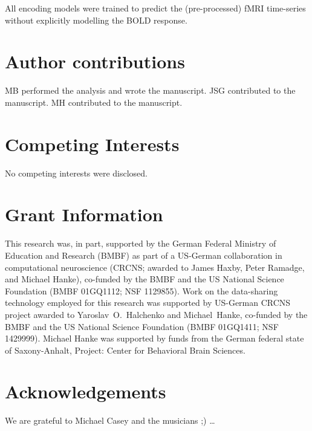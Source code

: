 All encoding models were trained to predict the (pre-processed) f{MRI}
time-series without explicitly modelling the BOLD response.


\section*{Author contributions}

MB performed the analysis and wrote the manuscript.
JSG contributed to the manuscript.
MH contributed to the manuscript.


\section*{Competing Interests}
No competing interests were disclosed.

\section*{Grant Information}

This research was, in part, supported by the German Federal Ministry of
Education and Research (BMBF) as part of a US-German collaboration in
computational neuroscience (CRCNS; awarded to James Haxby, Peter Ramadge, and
Michael Hanke), co-funded by the BMBF and the US National Science Foundation
(BMBF 01GQ1112; NSF 1129855).  Work on the data-sharing technology employed for
this research was supported by US-German CRCNS project awarded to
Yaroslav~O.~Halchenko and Michael~Hanke, co-funded by the BMBF and the US
National Science Foundation (BMBF 01GQ1411; NSF 1429999).  Michael Hanke was
supported by funds from the German federal state of Saxony-Anhalt, Project:
Center for Behavioral Brain Sciences.


\section*{Acknowledgements}

We are grateful to Michael Casey and the musicians ;) \ldots





